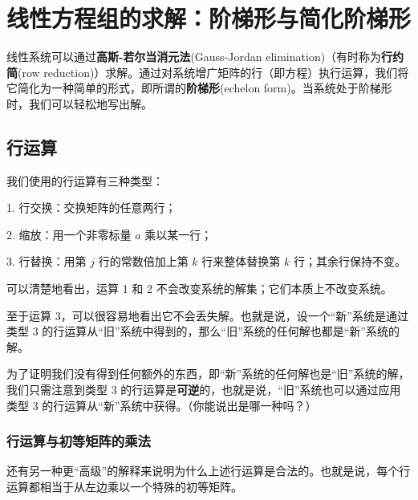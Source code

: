\section{线性方程组的求解：阶梯形与简化阶梯形}\label{sec:02-02}

线性系统可以通过\textbf{高斯-若尔当消元法}(Gauss-Jordan elimination)（有时称为\textbf{行约简}(row reduction)）求解。通过对系统增广矩阵的行（即方程）执行运算，我们将它简化为一种简单的形式，即所谓的\textbf{阶梯形}(echelon form)。当系统处于阶梯形时，我们可以轻松地写出解。

\subsection{行运算}\label{sec:02-02-01}

我们使用的行运算有三种类型：

1. 行交换：交换矩阵的任意两行；

2. 缩放：用一个非零标量 $a$ 乘以某一行；

3. 行替换：用第 $j$ 行的常数倍加上第 $k$ 行来整体替换第 $k$ 行；其余行保持不变。

可以清楚地看出，运算 1 和 2 不会改变系统的解集；它们本质上不改变系统。

至于运算 3，可以很容易地看出它不会丢失解。也就是说，设一个“新”系统是通过类型 3 的行运算从“旧”系统中得到的，那么“旧”系统的任何解也都是“新”系统的解。

为了证明我们没有得到任何额外的东西，即“新”系统的任何解也是“旧”系统的解，我们只需注意到类型 3 的行运算是\textbf{可逆}的，也就是说，“旧”系统也可以通过应用类型 3 的行运算从“新”系统中获得。（你能说出是哪一种吗？）

\subsubsection{行运算与初等矩阵的乘法}\label{sec:02-02-01-01}

还有另一种更“高级”的解释来说明为什么上述行运算是合法的。也就是说，每个行运算都相当于从左边乘以一个特殊的初等矩阵。

